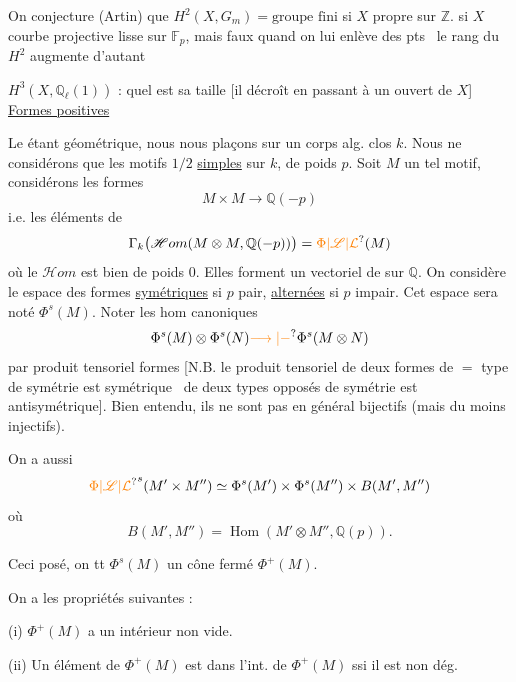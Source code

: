 On conjecture (Artin) que $H^2(X,G_m)={}\text{groupe fini}$ si $X$ propre sur $\mathbb{Z}$.   si $X$ courbe projective lisse sur $\mathbb{F}_p$, mais faux quand on lui enlève des pts \textendash\ le rang du $H^2$ augmente d'autant

$H^3(X,\mathbb{Q}_\ell(1))$ : quel est sa taille [il décroît en passant à un ouvert de $X$]
\uline{Formes positives}

Le  étant géométrique, nous nous plaçons sur un corps alg. clos $k$. Nous ne considérons que les motifs $1/2$ \uline{simples} sur $k$,  de poids $p$. Soit $M$ un tel motif, considérons les formes
\[
M\times M\longrightarrow\mathbb{Q}(-p)
\]
i.e. les éléments de
\[
\Gamma_k\bigl(\mathscr{H}om(M\otimes M,\mathbb{Q}(-p))\bigr)
=\unsure{\Phi|\mathscr{L}|\mathcal{L}}(M)
\]
où le  $\mathscr{H}om$ est bien de poids $0$. Elles forment un vectoriel de  sur $\mathbb{Q}$. On considère le espace   des formes \uline{symétriques} si $p$ pair, \uline{alternées} si $p$ impair. Cet espace sera noté $\Phi^s(M)$. Noter les hom canoniques
\[
\Phi^s(M)\otimes\Phi^s(N)\unsure{\longrightarrow|\mathbin{-}}\Phi^s(M\otimes N)
\]
par produit tensoriel  formes [N.B. le produit tensoriel de deux formes  de $=$ type de symétrie est symétrique \textendash\ de deux types opposés de symétrie est antisymétrique]. Bien entendu, ils ne sont pas en général bijectifs (mais du moins injectifs).

On a aussi
\[
\unsure{\Phi|\mathscr{L}|\mathcal{L}}^s(M'\times M'')\simeq
\Phi^s(M')\times\Phi^s(M'')\times B(M',M'')
\]
où
\[
B(M',M'')=\operatorname{Hom}(M'\otimes M'',\mathbb{Q}(p)).
\]

Ceci posé, on   tt $\Phi^s(M)$ un cône  fermé $\Phi^+(M)$.

On a les propriétés suivantes :

(i) $\Phi^+(M)$ a un intérieur non vide.

(ii) Un élément de $\Phi^+(M)$ est dans l'int. de $\Phi^+(M)$ ssi il est non dég.


